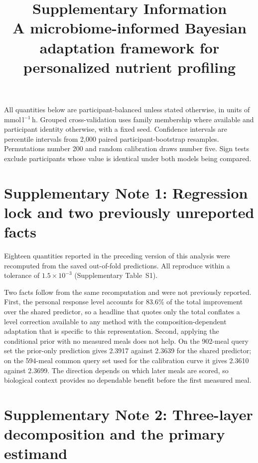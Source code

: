 \documentclass[10pt]{article}
\title{Supplementary Information\\[2mm]
\large A microbiome-informed Bayesian adaptation framework for personalized nutrient profiling}
\author{}\date{}
\begin{document}
\maketitle

All quantities below are participant-balanced unless stated otherwise, in units of
mmol\,l$^{-1}$\,h. Grouped cross-validation uses family membership where available and
participant identity otherwise, with a fixed seed. Confidence intervals are percentile intervals
from 2{,}000 paired participant-bootstrap resamples. Permutations number 200 and random
calibration draws number five. Sign tests exclude participants whose value is identical under both
models being compared.

\tableofcontents
\clearpage

\section*{Supplementary Note 1: Regression lock and two previously unreported facts}

Eighteen quantities reported in the preceding version of this analysis were recomputed from the
saved out-of-fold predictions. All reproduce within a tolerance of $1.5\times10^{-3}$
(Supplementary Table~S1).

Two facts follow from the same recomputation and were not previously reported. First, the personal
response level accounts for 83.6\% of the total improvement over the shared predictor, so a
headline that quotes only the total conflates a level correction available to any method with the
composition-dependent adaptation that is specific to this representation. Second, applying the
conditional prior with no measured meals does not help. On the 902-meal query set the prior-only
prediction gives 2.3917 against 2.3639 for the shared predictor; on the 594-meal common query set
used for the calibration curve it gives 2.3610 against 2.3699. The direction depends on which
later meals are scored, so biological context provides no dependable benefit before the first
measured meal.


\clearpage

\section*{Supplementary Note 2: Three-layer decomposition and the primary estimand}
\end{document}
